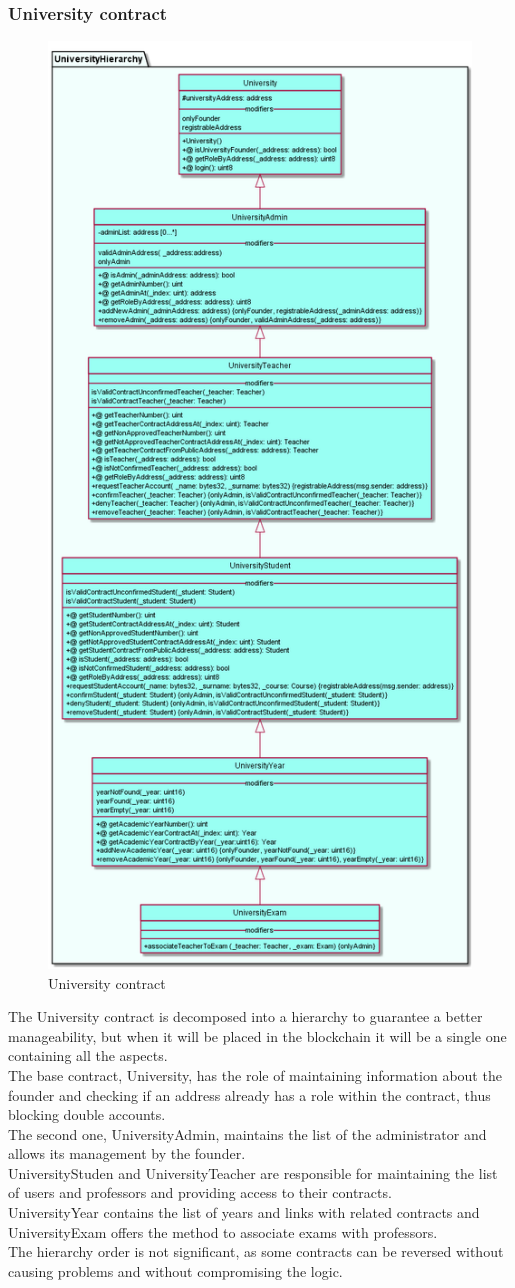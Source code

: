 \documentclass[ManualeSviluppatore.tex]{subfiles}
\begin{document}
\subsubsection{University contract}
\begin{figure}[H]
	\centering
	\includegraphics[width=0.5\linewidth]{"diagrammi/solidity/university"}
	\caption{University contract}
	\label{fig:University contract}
\end{figure}
The University contract is decomposed into a hierarchy to guarantee a better manageability, but when it will be placed in the blockchain it will be a single one containing all the aspects. \\
The base contract, University, has the role of maintaining information about the founder and checking if an address already has a role within the contract, thus blocking double accounts. \\
The second one, UniversityAdmin, maintains the list of the administrator and allows its management by the founder. \\
UniversityStuden and UniversityTeacher are responsible for maintaining the list of users and professors and providing access to their contracts. \\
UniversityYear contains the list of years and links with related contracts and UniversityExam offers the method to associate exams with professors. \\
The hierarchy order is not significant, as some contracts can be reversed without causing problems and without compromising the logic. \\
\end{document}
